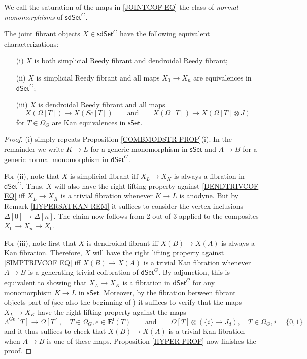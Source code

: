 \documentclass[a4paper,10pt
]{article}%
\begin{document}
We call the saturation of the maps in \eqref{JOINTCOF EQ} the class of \textit{normal monomorphisms} of $\mathsf{sdSet}^G$.

\begin{corollary}\label{JOINTFIBCHAR COR}
The joint fibrant objects $X \in \mathsf{sdSet}^G$ have the following equivalent characterizations:
\begin{itemize}
	\item[(i)] $X$ is both simplicial Reedy fibrant and dendroidal Reedy fibrant;
	\item[(ii)] $X$ is simplicial Reedy fibrant and all maps 
	$X_0 \to X_n$ are equivalences in $\mathsf{dSet}^{G}$;
	\item[(iii)] $X$ is dendroidal Reedy fibrant and all maps
\[
	X\left(\Omega[T]\right) \to X\left(Sc[T]\right)
\qquad \text{and} \qquad
	X\left(\Omega[T]\right) \to X(\Omega[T]\otimes J)
\]
for $T \in \Omega_G$ are Kan equivalences in $\mathsf{sSet}$.
\end{itemize}
\end{corollary}


\begin{proof}
(i) simply repeats Proposition \ref{COMBMODSTR PROP}(i). In the remainder we write $K \to L$ for a generic monomorphism in 
$\mathsf{sSet}$
and $A \to B$ for a generic normal monomorphism in $\mathsf{dSet}^G$.

For (ii), note that $X$ is simplicial fibrant iff 
$X_L \to X_K$ is always a fibration in $\mathsf{dSet}^G$. 
Thus, $X$ will also have the right lifting property against \eqref{DENDTRIVCOF EQ} iff 
$X_L \to X_K$ is a trivial fibration whenever $K \to L$ is anodyne. But by Remark \ref{HYPERSATKAN REM}
it suffices to consider the vertex inclusions $\Delta[0] \to \Delta[n]$.
The claim now follows from 2-out-of-3 applied to the composites $X_0 \to X_n \to X_0$.

For (iii), note first that $X$ is dendroidal fibrant iff $X(B) \to X(A)$ is always a Kan fibration.
Therefore, $X$ will have the right lifting property against \eqref{SIMPTRIVCOF EQ} iff 
$X(B) \to X(A)$ is a trivial Kan fibration whenever $A\to B$ is a generating trivial cofibration of $\mathsf{dSet}^G$.
By adjunction, this is equivalent to showing that
$X_L \to X_K$ is a fibration in $\mathsf{dSet}^G$ for any monomorphism $K \to L$ in $\mathsf{sSet}$. Moreover, by the fibration between fibrant objects part of \cite[Prop. 8.8]{Per17}
(see also the beginning of \cite[\S 8.1]{Per17})
it suffices to verify that the maps $X_L \to X_K$ have the right lifting property against the maps
\[
	\Lambda^{G e} [T] \to \Omega[T],
	\quad
	T \in \Omega_G, e \in \boldsymbol{E}^{\mathsf{i}}(T)
\qquad
\text{and}
\qquad
	\Omega[T] \otimes \left( \{i\} \to J_d\right),
	\quad
	T \in \Omega_G, i = \{0,1\}
\]
and it thus suffices to check that $X(B) \to X(A)$ is a trivial Kan fibration when $A\to B$ is one of these maps.
Proposition \ref{HYPER PROP} now finishes the proof.
\end{proof}
\end{document}
